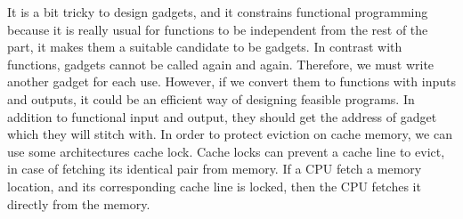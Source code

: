 		It is a bit tricky to design gadgets, and it constrains functional programming because it is really usual for functions to be independent from the rest of the part, it makes them a suitable candidate to be gadgets. In contrast with functions, gadgets cannot be called again and again. Therefore, we must write another gadget for each use. However, if we convert them to functions with inputs and outputs, it could be an efficient way of designing feasible programs. In addition to functional input and output, they should get the address of gadget which they will stitch with. In order to protect eviction on cache memory, we can use some architectures cache lock. Cache locks can prevent a cache line to evict, in case of fetching its identical pair from memory. If a CPU fetch a memory location, and its corresponding cache line is locked, then the CPU fetches it directly from the memory.